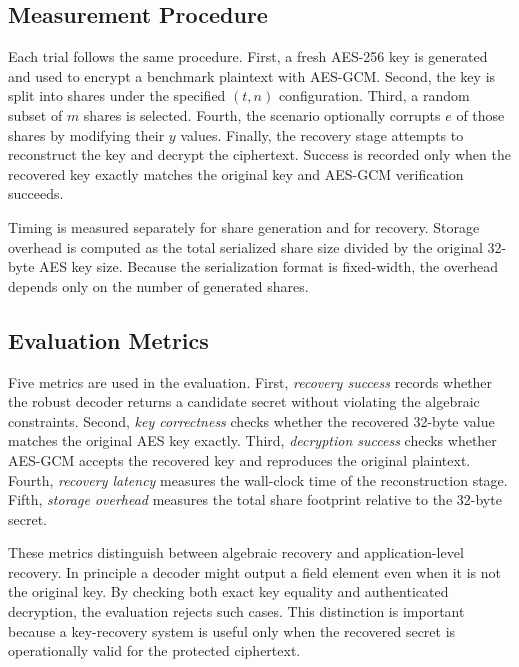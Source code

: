 \subsection{Measurement Procedure}

Each trial follows the same procedure. First, a fresh AES-256 key is generated and used to encrypt a benchmark plaintext with AES-GCM. Second, the key is split into shares under the specified $(t,n)$ configuration. Third, a random subset of $m$ shares is selected. Fourth, the scenario optionally corrupts $e$ of those shares by modifying their $y$ values. Finally, the recovery stage attempts to reconstruct the key and decrypt the ciphertext. Success is recorded only when the recovered key exactly matches the original key and AES-GCM verification succeeds.

Timing is measured separately for share generation and for recovery. Storage overhead is computed as the total serialized share size divided by the original 32-byte AES key size. Because the serialization format is fixed-width, the overhead depends only on the number of generated shares.

\subsection{Evaluation Metrics}

Five metrics are used in the evaluation. First, \textit{recovery success} records whether the robust decoder returns a candidate secret without violating the algebraic constraints. Second, \textit{key correctness} checks whether the recovered 32-byte value matches the original AES key exactly. Third, \textit{decryption success} checks whether AES-GCM accepts the recovered key and reproduces the original plaintext. Fourth, \textit{recovery latency} measures the wall-clock time of the reconstruction stage. Fifth, \textit{storage overhead} measures the total share footprint relative to the 32-byte secret.

These metrics distinguish between algebraic recovery and application-level recovery. In principle a decoder might output a field element even when it is not the original key. By checking both exact key equality and authenticated decryption, the evaluation rejects such cases. This distinction is important because a key-recovery system is useful only when the recovered secret is operationally valid for the protected ciphertext.

